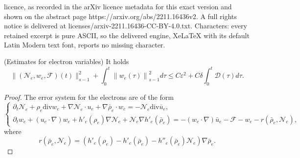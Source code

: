 \documentclass[10pt,a4paper]{amsart}
\newcommand{\Ne}{\mathcal{N}_e}
\newcommand{\dive}{\mathrm{div}}
\newcommand{\eps}{\mathbb{\varepsilon}}
\newcommand{\pt}{\partial_t}
\begin{document}
licence, as recorded in the arXiv licence metadata for this exact version and shown on the abstract page https://arxiv.org/abs/2211.16436v2. A full rights notice is delivered at licenses/arxiv-2211.16436-CC-BY-4.0.txt. Characters: every retained excerpt is pure ASCII, so the delivered engine, XeLaTeX with its default Latin Modern text font, reports no missing character.
\begin{lemma}\label{14} (Estimates for electron variables) It holds
\begin{equation}\label{regue}
    \|(\Ne,w_e,\mathcal{F})(t)\|_{s-1}^2 + \int_{0}^{t}\left\|w_e(\tau)\right\|^2_{s-1} d\tau 
    \leq  C\eps^2+C\delta\int_0^t\mathcal{D}(\tau)d\tau.
\end{equation}
\end{lemma}

\begin{proof} The error system for the electrons are of the form
\begin{equation*}
\begin{cases}
 \pt \mathcal{N}_e +\rho_e \dive w_e+\nabla\mathcal{N}_e\cdot u_e+\nabla\bar{\rho}_e\cdot w_e=- \mathcal{N}_e \dive\bar{u}_e,\\
 \pt w_e+(u_e \cdot \nabla) w_e+h'_e(\rho_e)\nabla\mathcal{N}_e+\mathcal{N}_e\nabla h'_e(\bar{\rho}_e)=-(w_e \cdot \nabla) \bar{u}_e
     -\mathcal{F}-w_e-r(\bar{\rho}_e,\mathcal{N}_e),
\end{cases}    
\end{equation*}
where
\begin{equation*}
    r(\bar{\rho}_e,\mathcal{N}_e)=(h'_e(\rho_e)-h'_e(\bar{\rho}_e)-h''_e(\bar{\rho}_e)\mathcal{N}_e)\nabla \bar{\rho}_e.
\end{equation*}


\end{proof}
\end{document}
